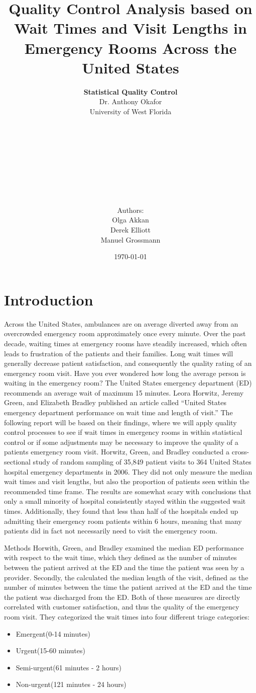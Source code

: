 \documentclass{article}
\title{Quality Control Analysis based on Wait Times and Visit Lengths in Emergency Rooms Across the United States}
\date{\today}
\author{\textbf{Statistical Quality Control}\\
	Dr. Anthony Okafor\\
	University of West Florida\\
	\\ \\ \\ \\ \\ \\ \\ \\ \\
	Authors:\\
	Olga Akkan\\
	Derek Elliott\\
	Manuel Grossmann}
\begin{document}
\maketitle
\thispagestyle{empty}
\pagebreak
\cleardoublepage
\setcounter{page}{1}

\section*{Introduction}
Across the United States, ambulances are on average diverted away from an overcrowded emergency room approximately once every minute. Over the past decade, waiting times at emergency rooms have steadily increased, which often leads to frustration of the patients and their families. Long wait times will generally decrease patient satisfaction, and consequently the quality rating of an emergency room visit. Have you ever wondered how long the average person is waiting in the emergency room? The United States emergency department (ED) recommends an average wait of maximum 15 minutes. Leora Horwitz, Jeremy Green, and Elizabeth Bradley published an article called “United States emergency department performance on wait time and length of visit.” The following report will be based on their findings, where we will apply quality control processes to see if wait times in emergency rooms in within statistical control or if some adjustments may be necessary to improve the quality of a patients emergency room visit.
Horwitz, Green, and Bradley conducted a cross-sectional study of random sampling of 35,849 patient visits to 364 United States hospital emergency departments in 2006. They did not only measure the median wait times and visit lengths, but also the proportion of patients seen within the recommended time frame. The results are somewhat scary with conclusions that only a small minority of hospital consistently stayed within the suggested wait times. Additionally, they found that less than half of the hospitals ended up admitting their emergency room patients within 6 hours, meaning that many patients did in fact not necessarily need to visit the emergency room.

Methods
Horwith, Green, and Bradley examined the median ED performance with respect to the wait time, which they defined as the number of minutes between the patient arrived at the ED and the time the patient was seen by a provider. Secondly, the calculated the median length of the visit, defined as the number of minutes between the time the patient arrived at the ED and the time the patient was discharged from the ED. Both of these measures are directly correlated with customer satisfaction, and thus the quality of the emergency room visit. They categorized the wait times into four different triage categories:
\begin{itemize}
	\item Emergent(0-14 minutes)
	\item Urgent(15-60 minutes)
	\item Semi-urgent(61 minutes - 2 hours)
	\item Non-urgent(121 minutes - 24 hours)
\end{itemize}
\end{document}
